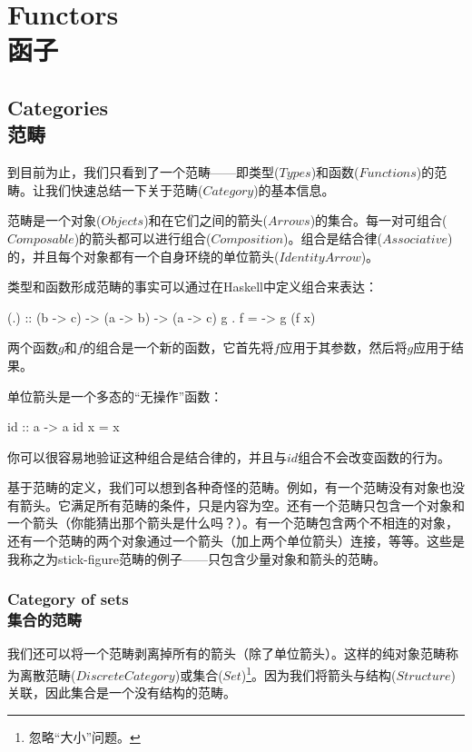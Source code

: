 \documentclass[DaoFP]{subfiles}
\begin{document}
    \setcounter{chapter}{7}

    \chapter{Functors\\函子}

    \section{Categories\\范畴}

    到目前为止，我们只看到了一个范畴——即类型($Types$)和函数($Functions$)的范畴。让我们快速总结一下关于范畴($Category$)的基本信息。

    范畴是一个对象($Objects$)和在它们之间的箭头($Arrows$)的集合。每一对可组合($Composable$)的箭头都可以进行组合($Composition$)。组合是结合律($Associative$)的，并且每个对象都有一个自身环绕的单位箭头($Identity Arrow$)。

    类型和函数形成范畴的事实可以通过在Haskell中定义组合来表达：
    \begin{haskell}
    (.) :: (b -> c) -> (a -> b) -> (a -> c)
    g . f = \x -> g (f x)
    \end{haskell}

    两个函数$g$和$f$的组合是一个新的函数，它首先将$f$应用于其参数，然后将$g$应用于结果。

    单位箭头是一个多态的“无操作”函数：
    \begin{haskell}
        id :: a -> a
        id x = x
    \end{haskell}

    你可以很容易地验证这种组合是结合律的，并且与$id$组合不会改变函数的行为。

    基于范畴的定义，我们可以想到各种奇怪的范畴。例如，有一个范畴没有对象也没有箭头。它满足所有范畴的条件，只是内容为空。还有一个范畴只包含一个对象和一个箭头（你能猜出那个箭头是什么吗？）。有一个范畴包含两个不相连的对象，还有一个范畴的两个对象通过一个箭头（加上两个单位箭头）连接，等等。这些是我称之为stick-figure范畴的例子——只包含少量对象和箭头的范畴。

    \subsection{Category of sets\\集合的范畴}

    我们还可以将一个范畴剥离掉所有的箭头（除了单位箭头）。这样的纯对象范畴称为离散范畴($Discrete Category$)或集合($Set$)\footnote{忽略“大小”问题。}。因为我们将箭头与结构($Structure$)关联，因此集合是一个没有结构的范畴。
\end{document}

